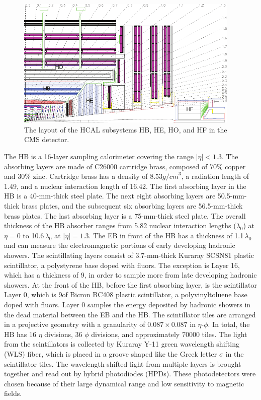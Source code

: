 \begin{figure}[hbt]
\begin{center}
\includegraphics[width=0.95\textwidth]{figures/HCAL_subdet.pdf}
\caption{The layout of the HCAL subsystems HB, HE, HO, and HF in the CMS detector.}
\label{fig:hcal-layout}
\end{center}
\end{figure}

The HB is a 16-layer sampling calorimeter covering the range $|\eta|<1.3$. The absorbing layers are made of C26000 cartridge brass, composed of 70\% copper and 30\% zinc. Cartridge brass has a density of $8.53\unit{g/cm}^3$, a radiation length of 1.49\cm, and a nuclear interaction length of 16.42\cm. The first absorbing layer in the HB is a 40-mm-thick steel plate. The next eight absorbing layers are 50.5-mm-thick brass plates, and the subsequent six absorbing layers are 56.5-mm-thick brass plates. The last absorbing layer is a 75-mm-thick steel plate. The overall thickness of the HB absorber ranges from 5.82 nuclear interaction lengths ($\lambda_{0}$) at $\eta=0$ to 10.6$\,\lambda_{0}$ at $|\eta|=1.3$. The EB in front of the HB has a thickness of 1.1$\,\lambda_{0}$ and can measure the electromagnetic portions of early developing hadronic showers. The scintillating layers consist of 3.7-mm-thick Kuraray SCSN81 plastic scintillator, a polystyrene base doped with fluors. The exception is Layer 16, which has a thickness of 9\mm, in order to sample more from late developing hadronic showers. At the front of the HB, before the first absorbing layer, is the scintillator Layer 0, which is 9\mm of Bicron BC408 plastic scintillator, a polyvinyltoluene base doped with fluors. Layer 0 samples the energy deposited by hadronic showers in the dead material between the EB and the HB. The scintillator tiles are arranged in a projective geometry with a granularity of $0.087\times0.087$ in $\eta$-$\phi$. In total, the HB has 16 $\eta$ divisions, 36 $\phi$ divisions, and approximately 70000 tiles. The light from the scintillators is collected by Kuraray Y-11 green wavelength shifting (WLS) fiber, which is placed in a groove shaped like the Greek letter $\sigma$ in the scintillator tiles. The wavelength-shifted light from multiple layers is brought together and read out by hybrid photodiodes (HPDs). These photodetectors were chosen because of their large dynamical range and low sensitivity to magnetic fields.

